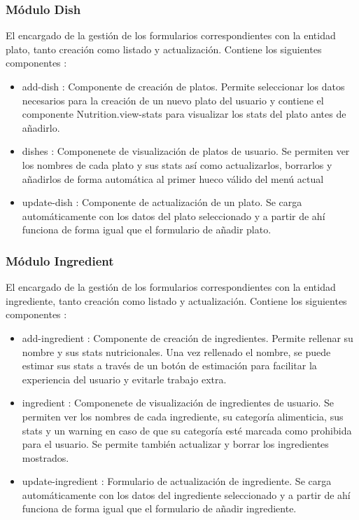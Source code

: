 \documentclass[12pt, a4paper, twoside]{book}
\begin{document}
	\subsubsection{Módulo Dish}
	El encargado de la gestión de los formularios correspondientes con la entidad plato, tanto creación como listado y actualización. Contiene los siguientes componentes : 
	\begin{itemize}
		\item add-dish : Componente de creación de platos. Permite seleccionar los datos necesarios para la creación de un nuevo plato del usuario y contiene el componente Nutrition.view-stats para visualizar los stats del plato antes de añadirlo.
		\item dishes : Componenete de visualización de platos de usuario. Se permiten ver los nombres de cada plato y sus stats así como actualizarlos, borrarlos y añadirlos de forma automática al primer hueco válido del menú actual
		\item update-dish : Componente de actualización de un plato. Se carga automáticamente con los datos del plato seleccionado y a partir de ahí funciona de forma igual que el formulario de añadir plato.		
	\end{itemize}
	\subsubsection{Módulo Ingredient}
	El encargado de la gestión de los formularios correspondientes con la entidad ingrediente, tanto creación como listado y actualización. Contiene los siguientes componentes : 
	\begin{itemize}
		\item add-ingredient : Componente de creación de ingredientes. Permite rellenar su nombre y sus stats nutricionales. Una vez rellenado el nombre, se puede estimar sus stats a través de un botón de estimación para facilitar la experiencia del usuario y evitarle trabajo extra.
		\item ingredient : Componenete de visualización de ingredientes de usuario. Se permiten ver los nombres de cada ingrediente, su categoría alimenticia, sus stats y un warning en caso de que su categoría esté marcada como prohibida para el usuario. Se permite también actualizar y borrar los ingredientes mostrados.
		\item update-ingredient : Formulario de actualización de ingrediente. Se carga automáticamente con los datos del ingrediente seleccionado y a partir de ahí funciona de forma igual que el formulario de añadir ingrediente.
	\end{itemize}
\end{document}
